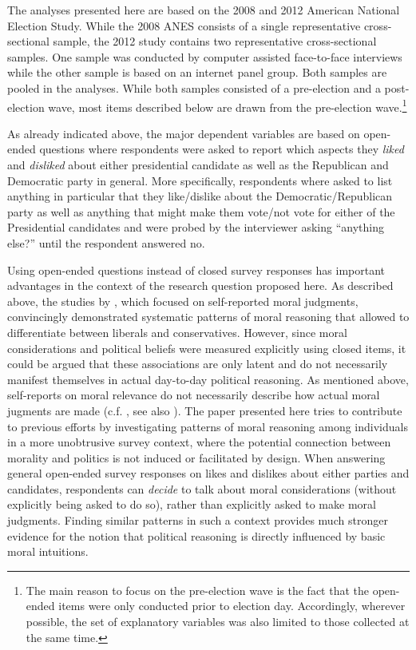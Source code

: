 \documentclass[12pt]{article}
\begin{document}
The analyses presented here are based on the 2008 and 2012 American National Election Study. While the 2008 ANES consists of a single representative cross-sectional sample, the 2012 study contains two representative cross-sectional samples. One sample was conducted by computer assisted face-to-face interviews while the other sample is based on an internet panel group. Both samples are pooled in the analyses. While both samples consisted of a pre-election and a post-election wave, most items described below are drawn from the pre-election wave.\footnote{The main reason to focus on the pre-election wave is the fact that the open-ended items were only conducted prior to election day. Accordingly, wherever possible, the set of explanatory variables was also limited to those collected at the same time.}

As already indicated above, the major dependent variables are based on open-ended questions where respondents were asked to report which aspects they \textit{liked} and \textit{disliked} about either presidential candidate as well as the Republican and Democratic party in general. More specifically, respondents where asked to list anything in particular that they like/dislike about the Democratic/Republican party as well as anything that might make them vote/not vote for either of the Presidential candidates and were probed by the interviewer asking ``anything else?'' until the respondent answered no.

Using open-ended questions instead of closed survey responses has important advantages in the context of the research question proposed here. As described above, the studies by \citet{graham2009liberals}, which focused on self-reported moral judgments, convincingly demonstrated systematic patterns of moral reasoning that allowed to differentiate between liberals and conservatives. However, since moral considerations and political beliefs were measured explicitly using closed items, it could be argued that these associations are only latent and do not necessarily manifest themselves in actual day-to-day political reasoning. As mentioned above, self-reports on moral relevance do not necessarily describe how actual moral jugments are made (c.f. \citealt[1031]{graham2009liberals}, see also \citealt{clifford2015moral}). The paper presented here tries to contribute to previous efforts by investigating patterns of moral reasoning among individuals in a more unobtrusive survey context, where the potential connection between morality and politics is not induced or facilitated by design. When answering general open-ended survey responses on likes and dislikes about either parties and candidates, respondents can \textit{decide} to talk about moral considerations (without explicitly being asked to do so), rather than explicitly asked to make moral judgments. Finding similar patterns in such a context provides much stronger evidence for the notion that political reasoning is directly influenced by basic moral intuitions.
\end{document}
